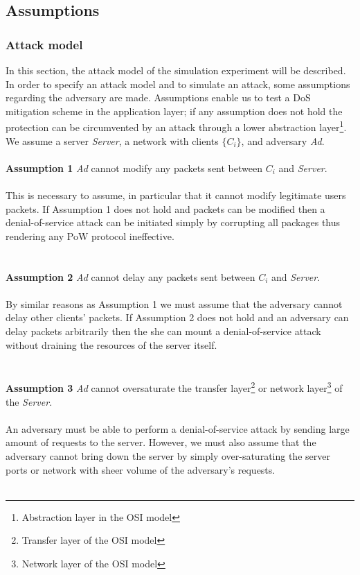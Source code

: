 \subsection{Assumptions}
\subsubsection{Attack model}
In this section, the attack model of the simulation experiment will be described.
In order to specify an attack model and to simulate an attack, some assumptions regarding the adversary are made.
Assumptions enable us to test a DoS mitigation scheme in the application layer; if any assumption does not hold the protection can be circumvented by an attack through a lower abstraction layer\footnote{Abstraction layer in the OSI model}. 
We assume a server \emph{Server}, a network with clients \emph{$\{C_i\}$}, and adversary \emph{Ad}.
\\
\\
\noindent \textbf{Assumption 1} \indent \emph{Ad} cannot modify any packets sent between \emph{$C_i$} and \emph{Server}.
\\
\\
This is necessary to assume, in particular that it cannot modify legitimate users packets. If Assumption 1 does not hold and packets can be modified then a denial-of-service attack can be initiated simply by corrupting all packages thus rendering any PoW protocol ineffective.
\\
\\
\\
\noindent \textbf{Assumption 2} \indent \emph{Ad} cannot delay any packets sent between \emph{$C_i$} and \emph{Server}.
\\
\\
By similar reasons as Assumption 1 we must assume that the adversary cannot delay other clients' packets. If Assumption 2 does not hold and an adversary can delay packets arbitrarily then the she can mount a denial-of-service attack without draining the resources of the server itself.
\\
\\
\\
\noindent \textbf{Assumption 3} \indent \emph{Ad} cannot oversaturate the transfer layer\footnote{Transfer layer of the OSI model} or network layer\footnote{Network layer of the OSI model} of the \emph{Server}.
\\
\\
An adversary must be able to perform a denial-of-service attack by sending large amount of requests to the server. However, we must also assume that the adversary cannot bring down the server by simply over-saturating the server ports or network with sheer volume of the adversary's requests.
\\
\\
